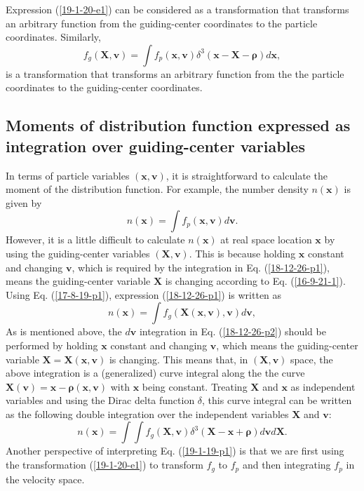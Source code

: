 \documentclass{article}
\newcommand{\tmmathbf}[1]{\ensuremath{\boldsymbol{#1}}}
\begin{document}
Expression (\ref{19-1-20-e1}) can be considered as a transformation that
transforms an arbitrary function from the guiding-center coordinates to the
particle coordinates. Similarly,
\begin{equation}
  f_g (\mathbf{X}, \mathbf{v}) = \int f_p (\mathbf{x}, \mathbf{v}) \delta^3
  (\mathbf{x}-\mathbf{X}-\tmmathbf{\rho}) d\mathbf{x},
\end{equation}
is a transformation that transforms an arbitrary function from the the
particle coordinates to the guiding-center coordinates.

\subsection{Moments of distribution function expressed as integration over
guiding-center variables}

In terms of particle variables $(\mathbf{x}, \mathbf{v})$, it is
straightforward to calculate the moment of the distribution function. For
example, the number density $n (\mathbf{x})$ is given by
\begin{equation}
  \label{18-12-26-p1} n (\mathbf{x}) = \int f_p (\mathbf{x}, \mathbf{v})
  d\mathbf{v}.
\end{equation}
However, it is a little difficult to calculate $n (\mathbf{x})$ at real space
location $\mathbf{x}$ by using the guiding-center variables $(\mathbf{X},
\mathbf{v})$. This is because holding $\mathbf{x}$ constant and changing
$\mathbf{v}$, which is required by the integration in Eq. (\ref{18-12-26-p1}),
means the guiding-center variable $\mathbf{X}$ is changing according to Eq.
(\ref{16-9-21-1}). Using Eq. (\ref{17-8-19-p1}), expression
(\ref{18-12-26-p1}) is written as
\begin{equation}
  \label{18-12-26-p2} n (\mathbf{x}) = \int f_g (\mathbf{X} (\mathbf{x},
  \mathbf{v}), \mathbf{v}) d\mathbf{v},
\end{equation}
As is mentioned above, the $d\mathbf{v}$ integration in Eq.
(\ref{18-12-26-p2}) should be performed by holding $\mathbf{x}$ constant and
changing $\mathbf{v}$, which means the guiding-center variable
$\mathbf{X}=\mathbf{X} (\mathbf{x}, \mathbf{v})$ is changing. This means that,
in $(\mathbf{X}, \mathbf{v})$ space, the above integration is a (generalized)
curve integral along the the curve \ $\mathbf{X} (\mathbf{v})
=\mathbf{x}-\tmmathbf{\rho} (\mathbf{x}, \mathbf{v})$ with $\mathbf{x}$ being
constant. Treating $\mathbf{X}$ and $\mathbf{x}$ as independent variables and
using the Dirac delta function $\delta$, this curve integral can be written as
the following double integration over the independent variables $\mathbf{X}$
and $\mathbf{v}$:
\begin{equation}
  \label{19-1-19-p1} n (\mathbf{x}) = \int \int f_g (\mathbf{X}, \mathbf{v})
  \delta^3 (\mathbf{X}-\mathbf{x}+\tmmathbf{\rho}) d\mathbf{v}d\mathbf{X}.
\end{equation}
Another perspective of interpreting Eq. (\ref{19-1-19-p1}) is that we are
first using the transformation (\ref{19-1-20-e1}) to transform $f_g$ to $f_p$
and then integrating $f_p$ in the velocity space.
\end{document}
